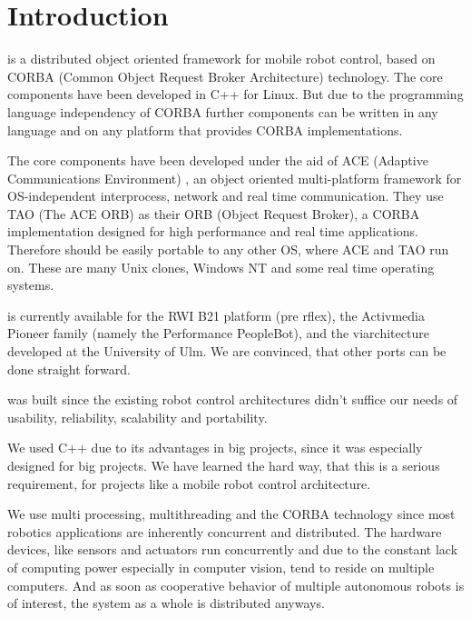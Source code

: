 \documentclass[10pt]{book}
\begin{document}
\pagestyle{headings}

\newpage
\tableofcontents


\chapter{Introduction}

\miro is a distributed object oriented framework for mobile robot
control, based on CORBA (Common Object Request Broker
Architecture) \cite{OMG:CORBA-standart} technology. The \miro core
components have been developed in C++ for Linux. But due to the
programming language independency of CORBA further components can be
written in any language and on any platform that provides CORBA
implementations.

The \miro core components have been developed under the aid of ACE
(Adaptive Communications Environment) \cite{ACE-Paper, ACE-Manual}, an
object oriented multi-platform framework for OS-independent
interprocess, network and real time communication. They use TAO (The
ACE ORB) \cite{TAO-paper} as their ORB (Object Request Broker), a
CORBA implementation designed for high performance and real time
applications. Therefore \miro should be easily portable to any other
OS, where ACE and TAO run on.  These are many Unix clones, Windows NT
and some real time operating systems.

\miro is currently available for the RWI B21 platform (pre rflex), the
Activmedia Pioneer family (namely the Performance PeopleBot), and the
vi\sparrow architecture developed at the University of Ulm.  We are
convinced, that other ports can be done straight forward.

\miro was built since the existing robot control architectures didn't
suffice our needs of usability, reliability, scalability and
portability.

We used C++ due to its advantages in big projects, since it was
especially designed for big projects. We have learned the hard way,
that this is a serious requirement, for projects like a mobile robot
control architecture.

We use multi processing, multithreading and the CORBA technology since
most robotics applications are inherently concurrent and distributed.
The hardware devices, like sensors and actuators run concurrently and
due to the constant lack of computing power especially in computer
vision, tend to reside on multiple computers. And as soon as
cooperative behavior of multiple autonomous robots is of interest, the
system as a whole is distributed anyways.
\end{document}
